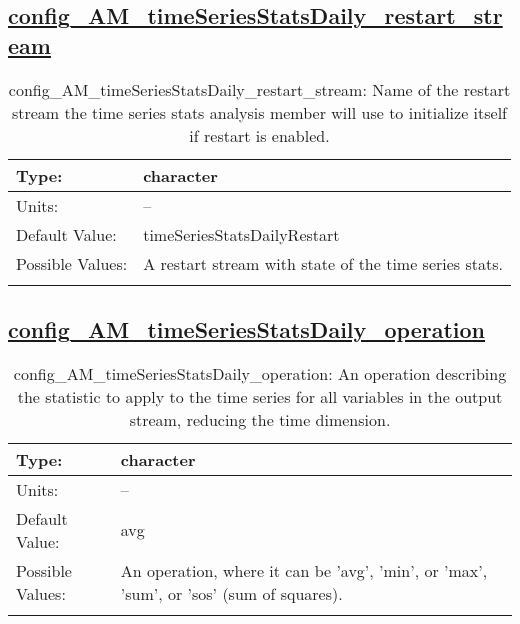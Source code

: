 \subsection[config\_AM\_timeSeriesStatsDaily\_restart\_stream]{\hyperref[sec:nm_tab_AM_timeSeriesStatsDaily]{config\_AM\_timeSeriesStatsDaily\_restart\_stream}}
\label{subsec:nm_sec_config_AM_timeSeriesStatsDaily_restart_stream}
\begin{center}
\begin{longtable}{| p{2.0in} || p{4.0in} |}
    \hline
    Type: & character \\
    \hline
    Units: & -- \\
    \hline
    Default Value: & timeSeriesStatsDailyRestart \\
    \hline
    Possible Values: & A restart stream with state of the time series stats. \\
    \hline
    \caption{config\_AM\_timeSeriesStatsDaily\_restart\_stream: Name of the restart stream the time series stats analysis member will use to initialize itself if restart is enabled.}
\end{longtable}
\end{center}
\subsection[config\_AM\_timeSeriesStatsDaily\_operation]{\hyperref[sec:nm_tab_AM_timeSeriesStatsDaily]{config\_AM\_timeSeriesStatsDaily\_operation}}
\label{subsec:nm_sec_config_AM_timeSeriesStatsDaily_operation}
\begin{center}
\begin{longtable}{| p{2.0in} || p{4.0in} |}
    \hline
    Type: & character \\
    \hline
    Units: & -- \\
    \hline
    Default Value: & avg \\
    \hline
    Possible Values: & An operation, where it can be 'avg', 'min', or 'max', 'sum', or 'sos' (sum of squares). \\
    \hline
    \caption{config\_AM\_timeSeriesStatsDaily\_operation: An operation describing the statistic to apply to the time series for all variables in the output stream, reducing the time dimension.}
\end{longtable}
\end{center}
